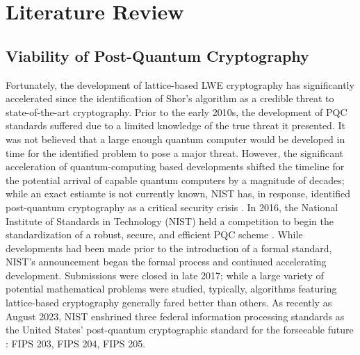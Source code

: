 \documentclass[12pt]{article}
\begin{document}
\section{Literature Review}\label{sec:literature-review}

\subsection{Viability of Post-Quantum Cryptography}
Fortunately, the development of lattice-based LWE cryptography has significantly accelerated since the identification of Shor's algorithm as a credible threat to state-of-the-art cryptography. 
Prior to the early 2010s, the development of PQC standards suffered due to a limited knowledge of the true threat it presented. 
It was not believed that a large enough quantum computer would be developed in time for the identified problem to pose a major threat. 
However, the significant acceleration of quantum-computing based developments shifted the timeline for the potential arrival of capable quantum computers by a magnitude of decades; while an exact estiamte is not currently known, NIST has, in response, identified post-quantum cryptography as a critical security crisis \autocite{computer_security_division_post-quantum_2017}. 
In 2016, the National Institute of Standards in Technology (NIST) held a competition to begin the standardization of a robust, secure, and efficient PQC scheme \autocite{noauthor_public-key_2016}.
While developments had been made prior to the introduction of a formal standard, NIST's announcement began the formal process and continued accelerating development. 
Submissions were closed in late 2017; while a large variety of potential mathematical problems were studied, typically, algorithms featuring lattice-based cryptography generally fared better than others. 
As recently as August 2023, NIST enshrined three federal information processing standards as the United States' post-quantum cryptographic standard for the forseeable future \autocite{noauthor_three_2023}: FIPS 203, FIPS 204, FIPS 205. 
\end{document}
